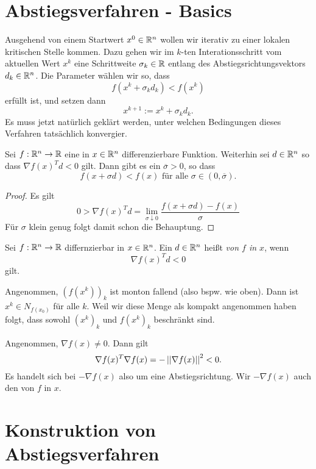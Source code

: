 
\section{Abstiegsverfahren - Basics}
Ausgehend von einem Startwert $x^0\in \mathbb{R}^n$ wollen wir iterativ zu einer lokalen kritischen Stelle kommen. Dazu gehen wir im $k$-ten Interationsschritt vom aktuellen Wert $x^k$ eine Schrittweite $\sigma_k\in \mathbb{R}$ entlang des Abstiegsrichtungsvektors $d_k\in \mathbb{R}^n$. Die Parameter wählen wir so, dass 
\[
f(x^k+\sigma_kd_k)<f(x^k)
\]
erfüllt ist, und setzen dann 
\[
x^{k+1}:= x^k+\sigma_kd_k.
\]
Es muss jetzt natürlich geklärt werden, unter welchen Bedingungen dieses Verfahren tatsächlich konvergier.
\begin{lem}\label{6:smallsteps}
	Sei $f:\mathbb{R}^n\to \mathbb{R}$ eine in $x\in \mathbb{R}^n$ differenzierbare Funktion. Weiterhin sei $d\in \mathbb{R}^n$ so dass $\nabla f(x)^Td<0$ gilt. Dann gibt es ein $\overline{\sigma}>0$, so dass 
	\[
	f(x+\sigma d)< f(x)\text{ für alle }\sigma \in (0,\overline{\sigma}).
	\]
\end{lem}

\begin{proof}
	Es gilt 
	\[
	0 > \nabla f(x)^Td = \lim_{\sigma \downarrow 0}\frac{f(x+\sigma d)-f(x)}{\sigma}
	\]
	Für $\sigma$ klein genug folgt damit schon die Behauptung.

\end{proof}

\begin{defn}
	Sei $f:\mathbb{R}^n\to \mathbb{R}$ differnzierbar in $x\in \mathbb{R}^n$. Ein $d\in \mathbb{R}^n$ heißt  \emph{von $f$ in $x$}, wenn 
	\[
	\nabla f(x)^Td < 0
	\]
	gilt.
\end{defn}
\begin{rem}\label{6:bounded}
	Angenommen, $(f(x^k))_k$ ist monton fallend (also bspw. wie oben). Dann ist $x^k\in N_{f(x_0)}$ für alle $k$. Weil wir diese Menge als kompakt angenommen haben folgt, dass sowohl $(x^k)_k$ und $f(x^k)_k$ beschränkt sind. 
\end{rem}
\begin{bsp}
	Angenommen, $\nabla f(x) \neq 0$. Dann gilt 
	\[
	\nabla f(x)^T\nabla f(x) = - \left|\left|\nabla f(x)\right|\right|^2 < 0.
	\]
	Es handelt sich bei $-\nabla f(x)$ also um eine Abstiegsrichtung. Wir $-\nabla f(x)$ auch den  von $f$ in $x$.
\end{bsp}

\section{Konstruktion von Abstiegsverfahren}
